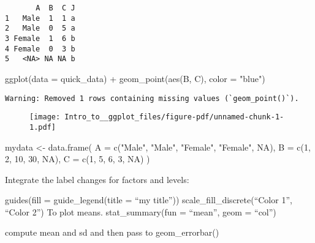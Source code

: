 \documentclass[
  letterpaper,
  DIV=11,
  numbers=noendperiod]{scrartcl}
\newenvironment{Shaded}{\begin{snugshade}}{\end{snugshade}}
\newcommand{\AttributeTok}[1]{\textcolor[rgb]{0.40,0.45,0.13}{#1}}
\newcommand{\ConstantTok}[1]{\textcolor[rgb]{0.56,0.35,0.01}{#1}}
\newcommand{\DecValTok}[1]{\textcolor[rgb]{0.68,0.00,0.00}{#1}}
\newcommand{\FunctionTok}[1]{\textcolor[rgb]{0.28,0.35,0.67}{#1}}
\newcommand{\NormalTok}[1]{\textcolor[rgb]{0.00,0.23,0.31}{#1}}
\newcommand{\OtherTok}[1]{\textcolor[rgb]{0.00,0.23,0.31}{#1}}
\newcommand{\SpecialCharTok}[1]{\textcolor[rgb]{0.37,0.37,0.37}{#1}}
\newcommand{\StringTok}[1]{\textcolor[rgb]{0.13,0.47,0.30}{#1}}
\begin{document}
\begin{verbatim}
       A  B  C J
1   Male  1  1 a
2   Male  0  5 a
3 Female  1  6 b
4 Female  0  3 b
5   <NA> NA NA b
\end{verbatim}

\begin{Shaded}
\begin{Highlighting}[]
\FunctionTok{ggplot}\NormalTok{(}\AttributeTok{data =}\NormalTok{ quick\_data) }\SpecialCharTok{+}
  \FunctionTok{geom\_point}\NormalTok{(}\FunctionTok{aes}\NormalTok{(B, C), }\AttributeTok{color =} \StringTok{"blue"}\NormalTok{)}
\end{Highlighting}
\end{Shaded}

\begin{verbatim}
Warning: Removed 1 rows containing missing values (`geom_point()`).
\end{verbatim}

\begin{figure}[H]

{\centering \texttt{[image: Intro\_to\_\_ggplot\_files/figure-pdf/unnamed-chunk-1-1.pdf]}

}

\end{figure}

\begin{Shaded}
\begin{Highlighting}[]
\NormalTok{mydata }\OtherTok{\textless{}{-}} \FunctionTok{data.frame}\NormalTok{(}
  \AttributeTok{A =} \FunctionTok{c}\NormalTok{(}\StringTok{"Male"}\NormalTok{, }\StringTok{"Male"}\NormalTok{, }\StringTok{"Female"}\NormalTok{, }\StringTok{"Female"}\NormalTok{, }\ConstantTok{NA}\NormalTok{),}
  \AttributeTok{B =} \FunctionTok{c}\NormalTok{(}\DecValTok{1}\NormalTok{, }\DecValTok{2}\NormalTok{, }\DecValTok{10}\NormalTok{, }\DecValTok{30}\NormalTok{, }\ConstantTok{NA}\NormalTok{),}
  \AttributeTok{C =} \FunctionTok{c}\NormalTok{(}\DecValTok{1}\NormalTok{, }\DecValTok{5}\NormalTok{, }\DecValTok{6}\NormalTok{, }\DecValTok{3}\NormalTok{, }\ConstantTok{NA}\NormalTok{)}
\NormalTok{)  }
\end{Highlighting}
\end{Shaded}

Integrate the label changes for factors and levels:

guides(fill = guide\_legend(title = ``my title''))
scale\_fill\_discrete(``Color 1'', ``Color 2'') To plot means.
stat\_summary(fun = ``mean'', geom = ``col'')

compute mean and sd and then pass to geom\_errorbar()
\end{document}
